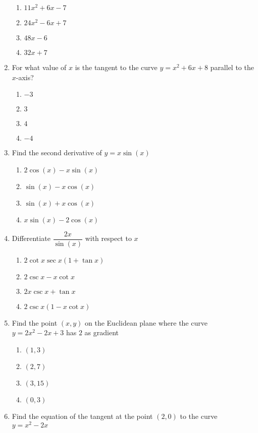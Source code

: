 \begin{multicols}{2}
\begin{enumerate}[label={\arabic*.}]
	\begin{enumerate}[label={\Alph*.}]
	\item \(11{x}^{2} + 6x - 7\)
	\item \(24{x}^{2} - 6x + 7\)
	\item \(48x - 6\)
	\item \(32x + 7\)
	\end{enumerate}
\item For what value of \(x\) is the tangent to the curve \(y = x^{2} + 6x + 8\) parallel to the \(x\)-axis?
	\begin{enumerate}[label={\Alph*.}]
	\item \(-3\)
	\item \(3\)
	\item \(4\)
	\item \(-4\)
	\end{enumerate}
\item Find the second derivative of \(y = x\sin(x)\)
	\begin{enumerate}[label={\Alph*.}]
	\item \(2\cos(x) - x \sin(x)\)
	\item \(\sin(x) - x \cos(x)\)
	\item \(\sin(x) + x \cos(x)\)
	\item \(x\sin(x)- 2 \cos(x)\)
	\end{enumerate}
\item Differentiate \(\dfrac{2x}{\sin(x)}\) with respect to \(x\)
	\begin{enumerate}[label={\Alph*.}]
	\item \(2\cot{x}\sec{x}(1 + \tan{x})\)
	\item \(2\csc{x} - x{\cot{x}}\)
	\item \(2x\csc{x} + \tan{x}\)
	\item \(2\csc{x}(1 - x{\cot{x}})\)
	\end{enumerate}
\item Find the point \((x, y)\) on the Euclidean plane where the curve \(y = 2{x}^{2} - 2x + 3\) has \(2\) as gradient
	\begin{enumerate}[label={\Alph*.}]
	\item \((1, 3)\)
	\item \((2, 7)\)
	\item \((3, 15)\)
	\item \((0, 3)\)
	\end{enumerate}
\item Find the equation of the tangent at the point \((2, 0)\) to the curve \(y = {x}^{2} - 2x\)
	\begin{enumerate}[label={\Alph*.}]

\end{enumerate}
\end{enumerate}
\end{multicols}
